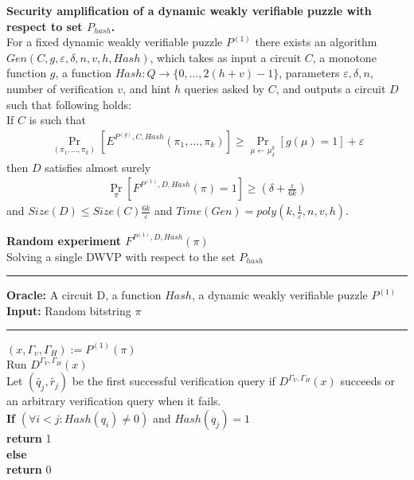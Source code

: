 \begin{lemma}\textbf{Security amplification of a dynamic weakly verifiable puzzle with respect to set $P_{hash}$.} \\
  For a fixed dynamic weakly verifiable puzzle $P^{(1)}$ there exists an algorithm\\
  $Gen(C, g, \varepsilon, \delta, n, v, h, Hash)$, which takes as input a circuit $C$, a monotone function $g$,
  a function $Hash : Q \rightarrow \{0, \dots, 2(h+v)-1\}$, parameters $\varepsilon, \delta, n$,
  number of verification $v$, and hint $h$ queries asked by $C$, and outputs a circuit $D$
  such that following holds: \\
  If $C$ is such that \\
  \begin{align*}
    \underset{(\pi_1, \dots, \pi_k)}{\Pr}[E^{P^{(g)}, C, Hash}(\pi_1, \dots, \pi_k)] \geq \underset{\mu \leftarrow \mu_\delta^k}{\Pr}[g(\mu) = 1] + \varepsilon
  \end{align*}
  then $D$ satisfies almost surely
  \begin{align*}
    \underset{\pi}{\Pr}[F^{P^{(1)},D, Hash}(\pi) = 1] \geq (\delta + \frac{\varepsilon}{6k})
  \end{align*}
  and $Size(D) \leq Size(C)\frac{6k}{\varepsilon}$ and $Time(Gen) = poly(k, \frac{1}{\varepsilon}, n, v, h)$.
\end{lemma}
%
%
\begin{codeblock}
  \textbf{Random experiment $F^{P^{(1)}, D, Hash}(\pi)$} \\
  Solving a single DWVP with respect to the set $P_{hash}$
  \medskip

  \hrule

  \medskip

  \textbf{Oracle:} A circuit D, a function $Hash$, a dynamic weakly verifiable puzzle $P^{(1)}$\\
  \textbf{Input:} Random bitstring $\pi$
  \medskip\hrule\medskip

  $(x, \Gamma_v, \Gamma_H) := P^{(1)}(\pi)$ \\
  Run $D^{\Gamma_V, \Gamma_H}(x)$ \\
  \IndI Let $(\widetilde{q_j},\widetilde{r_j})$ be the first successful verification query if $D^{\Gamma_V, \Gamma_H}(x)$ succeeds or \\
  \IndI an arbitrary verification query when it fails.\\
  \textbf{If} $(\forall i < j :  Hash(q_i) \neq 0 )$ and $Hash(q_j) = 1$ \\
  \IndI \textbf{return} 1\\
  \textbf{else}\\
  \IndI \textbf{return} 0\\

\end{codeblock}
%
%


